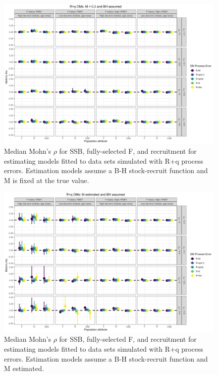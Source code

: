 \documentclass[
  12pt,
]{article}
\begin{document}
\begin{landscape}
\begin{figure}
\caption{Median Mohn's $\rho$ for SSB, fully-selected F, and recruitment for estimating models fitted to data sets simulated with R+q process errors.  Estimation models assume a B-H stock-recruit function and M is fixed at the true value.}\label{q_om_em_BH_MF_mohns_rho}
\begin{center}
\includegraphics[width = \textwidth]{q_om_mohns_rho_BH_MF.png}
\end{center}
\end{figure}
\end{landscape}

\begin{landscape}
\begin{figure}
\caption{Median Mohn's $\rho$ for SSB, fully-selected F, and recruitment for estimating models fitted to data sets simulated with R+q process errors.  Estimation models assume a B-H stock-recruit function and M estimated.}\label{q_om_em_BH_ME_mohns_rho}
\begin{center}
\includegraphics[width = \textwidth]{q_om_mohns_rho_BH_ME.png}
\end{center}
\end{figure}
\end{landscape}
\end{document}
